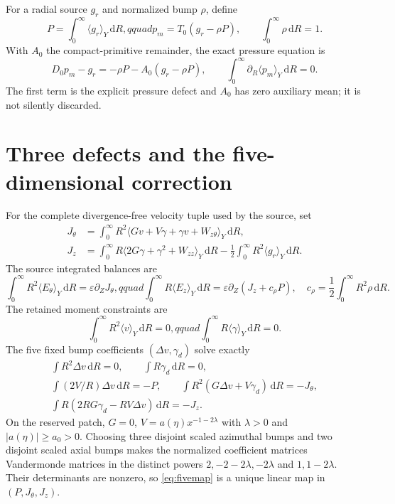 \documentclass[11pt]{article}
\newcommand{\dd}{\,\mathrm d}
\begin{document}
For a radial source $g_r$ and normalized bump $\rho$, define
\begin{equation}
 P=\int_0^\infty\langle g_r\rangle_Y\dd R,qquad
 p_m=T_0(g_r-\rho P),\qquad \int_0^\infty\rho\dd R=1.\label{eq:pressure}
\end{equation}
With $A_0$ the compact-primitive remainder, the exact pressure equation is
\begin{equation}
 D_0p_m-g_r=-\rho P-A_0(g_r-\rho P),\qquad
 \int_0^\infty\partial_R\langle p_m\rangle_Y\dd R=0.\label{eq:pressureidentity}
\end{equation}
The first term is the explicit pressure defect and $A_0$ has zero auxiliary mean; it is not
silently discarded.

\section{Three defects and the five-dimensional correction}
For the complete divergence-free velocity tuple used by the source, set
\begin{align}
 J_\theta&=\int_0^\infty R^2\langle Gv+V\gamma+\gamma v+W_{z\theta}\rangle_Y\dd R,\\
 J_z&=\int_0^\infty R\langle2G\gamma+\gamma^2+W_{zz}\rangle_Y\dd R
 -\frac12\int_0^\infty R^2\langle g_r\rangle_Y\dd R.\label{eq:defects}
\end{align}
The source integrated balances are
\begin{equation}
 \int_0^\infty R^2\langle E_\theta\rangle_Y\dd R=\varepsilon\partial_ZJ_\theta,qquad
 \int_0^\infty R\langle E_z\rangle_Y\dd R=\varepsilon\partial_Z(J_z+c_\rho P),
 \quad c_\rho=\frac12\int_0^\infty R^2\rho\dd R.\label{eq:integrated}
\end{equation}
The retained moment constraints are
\begin{equation}
 \int_0^\infty R^2\langle v\rangle_Y\dd R=0,qquad
 \int_0^\infty R\langle\gamma\rangle_Y\dd R=0.\label{eq:moments}
\end{equation}
The five fixed bump coefficients $(\Delta v,\gamma_d)$ solve exactly
\begin{equation}
\begin{gathered}
 \int R^2\Delta v\dd R=0,\qquad \int R\gamma_d\dd R=0,\\
 \int (2V/R)\Delta v\dd R=-P,\qquad
 \int R^2(G\Delta v+V\gamma_d)\dd R=-J_\theta,\\
 \int R(2RG\gamma_d-RV\Delta v)\dd R=-J_z.
\end{gathered}\label{eq:fivemap}
\end{equation}
On the reserved patch, $G=0$, $V=a(\eta)x^{-1-2\lambda}$ with $\lambda>0$ and
$|a(\eta)|\ge a_0>0$. Choosing three disjoint scaled azimuthal bumps and two disjoint
scaled axial bumps makes the normalized coefficient matrices Vandermonde matrices in the
distinct powers $2,-2-2\lambda,-2\lambda$ and $1,1-2\lambda$. Their determinants are nonzero,
so \eqref{eq:fivemap} is a unique linear map in $(P,J_\theta,J_z)$.
\end{document}
